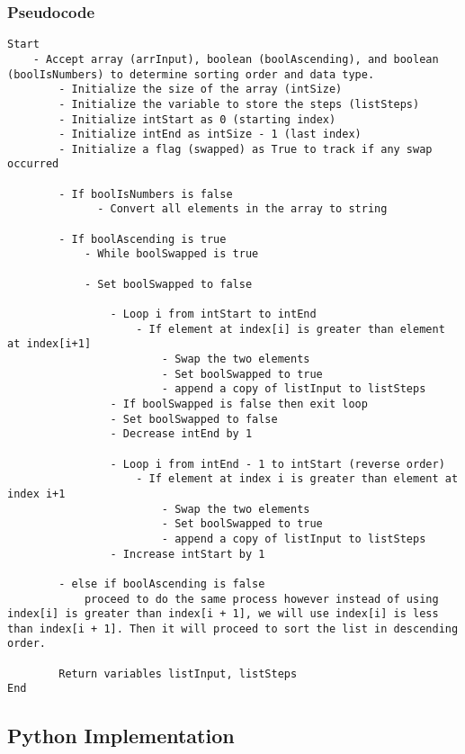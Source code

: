 \documentclass{article}
\begin{document}
\subsubsection*{Pseudocode}
\begin{lstlisting}
Start
    - Accept array (arrInput), boolean (boolAscending), and boolean (boolIsNumbers) to determine sorting order and data type.
        - Initialize the size of the array (intSize)
        - Initialize the variable to store the steps (listSteps)
        - Initialize intStart as 0 (starting index)
        - Initialize intEnd as intSize - 1 (last index)
        - Initialize a flag (swapped) as True to track if any swap occurred

        - If boolIsNumbers is false
              - Convert all elements in the array to string

        - If boolAscending is true
            - While boolSwapped is true

            - Set boolSwapped to false
            
                - Loop i from intStart to intEnd
                    - If element at index[i] is greater than element at index[i+1]
                        - Swap the two elements
                        - Set boolSwapped to true
                        - append a copy of listInput to listSteps
                - If boolSwapped is false then exit loop
                - Set boolSwapped to false
                - Decrease intEnd by 1

                - Loop i from intEnd - 1 to intStart (reverse order)
                    - If element at index i is greater than element at index i+1
                        - Swap the two elements
                        - Set boolSwapped to true
                        - append a copy of listInput to listSteps
                - Increase intStart by 1
        
        - else if boolAscending is false
            proceed to do the same process however instead of using index[i] is greater than index[i + 1], we will use index[i] is less than index[i + 1]. Then it will proceed to sort the list in descending order.

        Return variables listInput, listSteps
End
\end{lstlisting}

\subsection*{Python Implementation}
\end{document}
